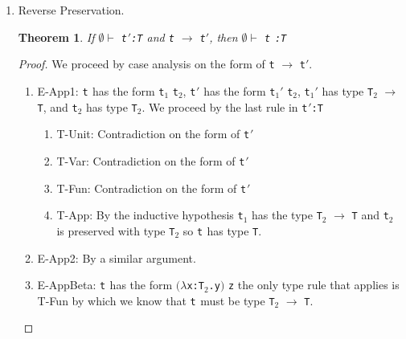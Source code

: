 \documentclass{article}
\newcommand{\term}[1]{{\tt t$_{#1}$}}
\newtheorem{theorem}{Theorem}
\begin{document}
\begin{enumerate}
\begin{enumerate}
           \begin{proof}
             It is always the case that we can construct a term that steps to some \term{}$'$ by wrapping \term{}$'$ in a capture avoiding thunk and applying it. For example, $(\lambda$\verb|x:unit.|\term{}$')$ \verb|unit|, while ensuring \verb|x| is not free in \term{}$'$.
           \end{proof}

         \item Reverse Preservation.
           \begin{theorem}
             If $\emptyset \vdash$ \term{}$'$\verb|:T| and \verb|t| $\longrightarrow$ \verb|t|$'$, then $\emptyset \vdash$ \term{} \verb|:T|
           \end{theorem}

           \begin{proof}
             We proceed by case analysis on the form of \verb|t| $\longrightarrow$ \verb|t|$'$.
             \begin{enumerate}
             \item E-App1: \term{} has the form \term{1} \term{2}, \term{}$'$ has the form \term{1}$'$ \term{2}, \term{1}$'$ has type \verb|T|$_2$ $\rightarrow$ \verb|T|, and \term{2} has type \verb|T|$_2$. We proceed by the last rule in \term{}$'$\verb|:T|
               \begin{enumerate}
                 \item T-Unit: Contradiction on the form of \term{}$'$
                 \item T-Var: Contradiction on the form of \term{}$'$
                 \item T-Fun: Contradiction on the form of \term{}$'$
                 \item T-App: By the inductive hypothesis \term{1} has the type \verb|T|$_2$ $\rightarrow$ \verb|T| and \term{2} is preserved with type \verb|T|$_2$ so \term{} has type \verb|T|.
               \end{enumerate}
             \item E-App2: By a similar argument.
             \item E-AppBeta: \term{} has the form $(\lambda$\verb|x:T|$_2$\verb|.y|$)$ \verb|z| the only type rule that applies is T-Fun by which we know that \term{} must be type \verb|T|$_2$ $\rightarrow$ \verb|T|.
             \end{enumerate}
           \end{proof}

       \end{enumerate}
     \end{enumerate}
\end{document}
